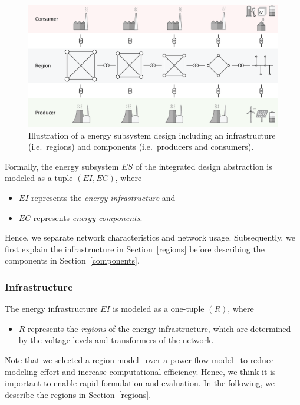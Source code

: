 \begin{figure}[h]
	\begin{center}
	\includegraphics[trim=0 10 0 15, width=0.95\columnwidth]{./gfx/energy_system.png}
	\caption{Illustration of a energy subsystem design including an infrastructure (i.e.\ regions) and components (i.e.\ producers and consumers).}
	\label{energy_illustration}
	\end{center}
\end{figure}

Formally, the energy subsystem $ES$ of the integrated design abstraction is modeled as a tuple $(EI, EC)$, where
\begin{itemize}
	\item $EI$ represents the \textit{energy infrastructure} and
	\item $EC$ represents \textit{energy components}.
\end{itemize}
Hence, we separate network characteristics and network usage. Subsequently, we first explain the infrastructure in Section~\ref{regions} before describing the components in Section~\ref{components}.

\subsubsection{Infrastructure}
\label{energy_infrastructure}

The energy infrastructure $EI$ is modeled as a one-tuple $(R)$, where
\begin{itemize}
	\item $R$ represents the \textit{regions} of the energy infrastructure, which are determined by the voltage levels and transformers of the network.
\end{itemize}
Note that we selected a region model~\cite{Hackenberg2012} over a power flow model~\cite{Dommel1968} to reduce modeling effort and increase computational efficiency. Hence, we think it is important to enable rapid formulation and evaluation. In the following, we describe the regions in Section~\ref{regions}.

